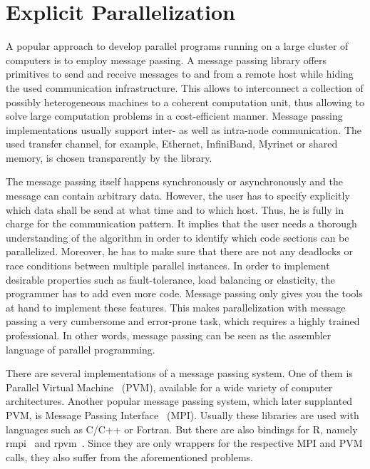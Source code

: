 \section{Explicit Parallelization}

A popular approach to develop parallel programs running on a large cluster of computers is to employ message passing.
A message passing library offers primitives to send and receive messages to and from a remote host while hiding the used communication infrastructure.
This allows to interconnect a collection of possibly heterogeneous machines to a coherent computation unit, thus allowing to solve large computation problems in a cost-efficient manner.
Message passing implementations usually support inter- as well as intra-node communication.
The used transfer channel, for example, Ethernet, InfiniBand, Myrinet or shared memory, is chosen transparently by the library.

The message passing itself happens synchronously or asynchronously and the message can contain arbitrary data.
However, the user has to specify explicitly which data shall be send at what time and to which host.
Thus, he is fully in charge for the communication pattern.
It implies that the user needs a thorough understanding of the algorithm in order to identify which code sections can be parallelized.
Moreover, he has to make sure that there are not any deadlocks or race conditions between multiple parallel instances.
In order to implement desirable properties such as fault-tolerance, load balancing or elasticity, the programmer has to add even more code.
Message passing only gives you the tools at hand to implement these features.
This makes parallelization with message passing a very cumbersome and error-prone task, which requires a highly trained professional.
In other words, message passing can be seen as the assembler language of parallel programming.

There are several implementations of a message passing system.
One of them is Parallel Virtual Machine~\cite{geist:1994a} (PVM), available for a wide variety of computer architectures.
Another popular message passing system, which later supplanted PVM, is Message Passing Interface~\cite{lusk:2009a} (MPI).
Usually these libraries are used with languages such as C/C++ or Fortran.
But there are also bindings for R, namely rmpi~\cite{rmpi} and rpvm~\cite{rpvm}.
Since they are only wrappers for the respective MPI and PVM calls, they also suffer from the aforementioned problems.

